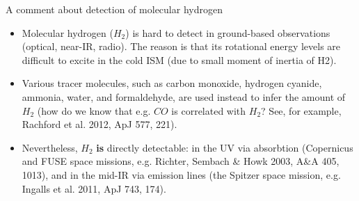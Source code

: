 \documentclass[letterpaper,landscape]{slides}
\begin{document}
\begin{slide}
\begin{center}
{\large \color{red} A comment about detection of molecular hydrogen}
\end{center}

\begin{itemize}
\item Molecular hydrogen ($H_2$) is hard to detect in ground-based observations 
(optical, near-IR, radio). The reason is that its rotational energy levels are difficult 
to excite in the cold ISM (due to small moment of inertia of H2). 
\item Various tracer molecules, such as carbon monoxide, hydrogen cyanide, ammonia, water, 
and formaldehyde, are used instead to infer the amount of $H_2$ (how do we know that e.g. 
$CO$ is correlated with $H_2$?  See, for example, 	Rachford et al. 2012, ApJ 577, 221). 
\item Nevertheless, {\color{blue} $H_2$ {\bf is} directly detectable:} in the UV via absorbtion
(Copernicus and FUSE space missions, e.g. Richter, Sembach \& Howk 2003, A\&A 405, 1013), 
and in the mid-IR via emission lines (the Spitzer space mission, e.g. Ingalls et al. 2011, 
ApJ 743, 174).
\end{itemize}          

\vfill
\end{slide}
\end{document}
